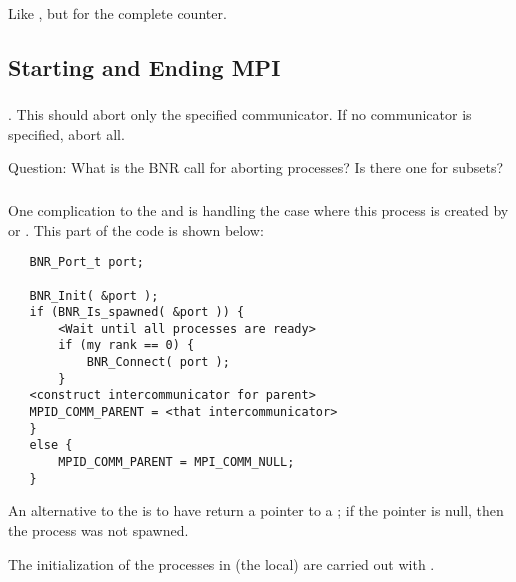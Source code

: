 \documentclass{article}
\begin{document}
Like , but for the complete counter.



\subsection{Starting and Ending MPI}
\label{sec:init}

\subsubsection{}
\begin{adi3}
.  This should abort only the specified communicator.  If
no communicator is specified, abort all.  

Question: What is the BNR call for aborting processes?  Is there one for
subsets?  
\end{adi3}

\subsubsection{}

One complication to the  and  is
handling the case where this process is created by  or
.  This part of the code is shown below:
\begin{verbatim}
   BNR_Port_t port;

   BNR_Init( &port );
   if (BNR_Is_spawned( &port )) {
       <Wait until all processes are ready>
       if (my rank == 0) {
           BNR_Connect( port );
       }
   <construct intercommunicator for parent>
   MPID_COMM_PARENT = <that intercommunicator>
   }
   else {
       MPID_COMM_PARENT = MPI_COMM_NULL;
   }
\end{verbatim}
An alternative to the  is to have 
return a pointer to a ; if the pointer is null, then the
process was not spawned.

The initialization of the processes in (the local) 
are carried out with .
\end{document}
